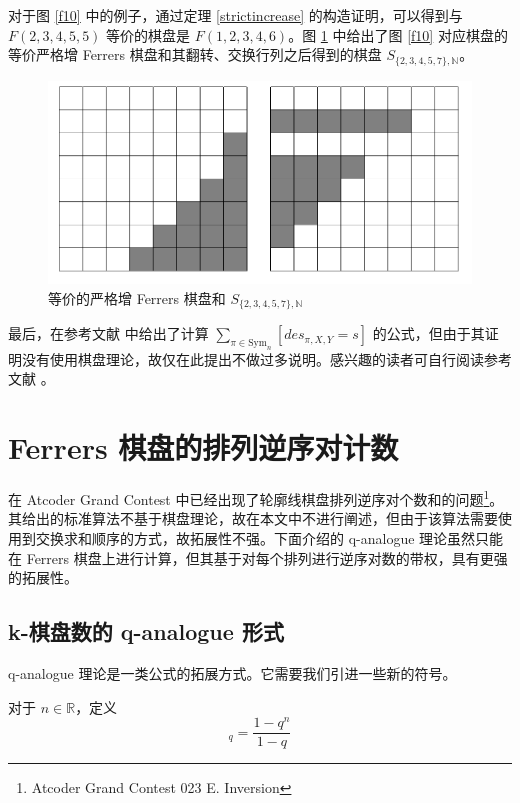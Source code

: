 \documentclass{noithesis}
\begin{document}
	对于图 \ref{f10} 中的例子，通过定理 \ref{strictincrease} 的构造证明，可以得到与 $F(2,3,4,5,5)$ 等价的棋盘是 $F(1,2,3,4,6)$。图 \ref{f11} 中给出了图 \ref{f10} 对应棋盘的等价严格增 Ferrers 棋盘和其翻转、交换行列之后得到的棋盘 $S_{\{2,3,4,5,7\},\mathbb{N}}$。
	
	\begin{figure}[h]
		\centering
		\caption{等价的严格增 Ferrers 棋盘和 $S_{\{2,3,4,5,7\},\mathbb{N}}$}
		\label{f11}
		\includegraphics[scale=0.3]{picture/figure11.png}
	\end{figure}
	
	最后，在参考文献 \cite{2008Counting} 中给出了计算 $\sum_{\pi \in \mathrm{Sym}_n} [des_{\pi,X,Y} = s]$ 的公式，但由于其证明没有使用棋盘理论，故仅在此提出不做过多说明。感兴趣的读者可自行阅读参考文献 \cite{2008Counting}。
	\section{Ferrers 棋盘的排列逆序对计数}
	
	在 Atcoder Grand Contest 中已经出现了轮廓线棋盘排列逆序对个数和的问题\footnote{Atcoder Grand Contest 023 E. Inversion}。其给出的标准算法不基于棋盘理论，故在本文中不进行阐述，但由于该算法需要使用到交换求和顺序的方式，故拓展性不强。下面介绍的 q-analogue 理论虽然只能在 Ferrers 棋盘上进行计算，但其基于对每个排列进行逆序对数的带权，具有更强的拓展性。
	\subsection{k-棋盘数的 q-analogue 形式}
	
	q-analogue 理论是一类公式的拓展方式。它需要我们引进一些新的符号。
	
	对于 $n \in \mathbb{R}$，定义 \begin{equation*}
	[n]_q = \frac{1-q^n}{1-q}
	\end{equation*}
	
\end{document}
